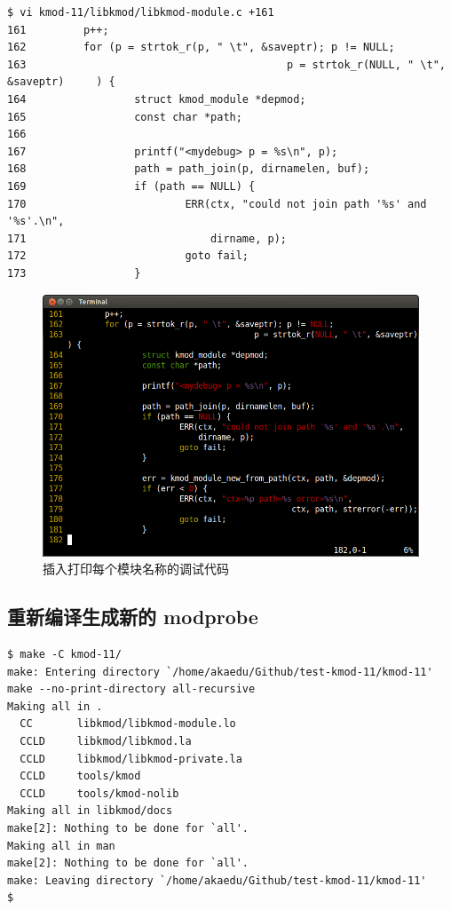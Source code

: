 {\begin{shaded}\begin{verbatim}
$ vi kmod-11/libkmod/libkmod-module.c +161
161         p++;
162         for (p = strtok_r(p, " \t", &saveptr); p != NULL;
163                                         p = strtok_r(NULL, " \t", &saveptr)     ) {
164                 struct kmod_module *depmod;
165                 const char *path;
166 
167                 printf("<mydebug> p = %s\n", p);
168                 path = path_join(p, dirnamelen, buf);
169                 if (path == NULL) {
170                         ERR(ctx, "could not join path '%s' and '%s'.\n",
171                             dirname, p);
172                         goto fail;
173                 }
\end{verbatim}\end{shaded}}
\begin{figure}[htbp]
\centering
\includegraphics{./pictures/3-4-print-p.png}
\caption{插入打印每个模块名称的调试代码}
\end{figure}

\subsection{重新编译生成新的 modprobe}

{\begin{shaded}\begin{verbatim}
$ make -C kmod-11/
make: Entering directory `/home/akaedu/Github/test-kmod-11/kmod-11'
make --no-print-directory all-recursive
Making all in .
  CC       libkmod/libkmod-module.lo
  CCLD     libkmod/libkmod.la
  CCLD     libkmod/libkmod-private.la
  CCLD     tools/kmod
  CCLD     tools/kmod-nolib
Making all in libkmod/docs
make[2]: Nothing to be done for `all'.
Making all in man
make[2]: Nothing to be done for `all'.
make: Leaving directory `/home/akaedu/Github/test-kmod-11/kmod-11'
$ 
\end{verbatim}\end{shaded}}
